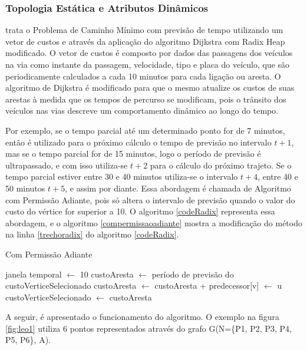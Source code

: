 \subsubsection{Topologia Estática e Atributos Dinâmicos}
\label{subsec:limitesuperior}
\cite{leonard} trata o Problema de Caminho Mínimo com previsão de tempo utilizando um vetor de custos e
através da aplicação do algoritmo Dijkstra com Radix Heap modificado. O vetor de custos é composto por dados das passagens 
dos veículos na via como instante da passagem, velocidade, tipo e placa do veículo, que são periodicamente calculados
a cada 10 minutos para cada ligação ou aresta. O algoritmo de Dijkstra é modificado para que o mesmo atualize os custos
de suas arestas à medida que os tempos de percurso se modificam, pois o trânsito dos veículos nas vias descreve um
comportamento dinâmico ao longo do tempo.

Por exemplo, se o tempo parcial até um determinado ponto for de 7 minutos, então
é utilizado para o próximo cálculo o tempo de previsão no intervalo $t + 1$, mas se o tempo parcial for de 15 minutos, logo
o período de previsão é ultrapassado, e com isso utiliza-se $t + 2$ para o cálculo do próximo trajeto. Se o tempo parcial
estiver entre 30 e 40 minutos utiliza-se o intervalo $t + 4$, entre 40 e 50 minutos $t + 5$, e assim por diante.
Essa abordagem é chamada de Algoritmo com Permissão Adiante, pois só altera o intervalo de previsão quando o valor do custo
do vértice for superior a 10.
O algoritmo \ref{codeRadix} representa essa abordagem, e o algoritmo \ref{compermissaoadiante} mostra a modificação
do método na linha \ref{trechoradix} do algoritmo \ref{codeRadix}.

\begin{algorithm}
\caption{Com Permissão Adiante}
\begin{algorithmic}[1]
\State janela temporal $\leftarrow$ 10
  \State custoAresta $\leftarrow$ período de previsão do custoVerticeSelecionado
\EndIf
{}
  \State custoAresta $\leftarrow$ custoAresta + 	
  \State predecessor[v] $\leftarrow$ u
\EndIf
\State custoVerticeSelecionado $\leftarrow$ custoAresta
\end{algorithmic}
\label{compermissaoadiante}
\end{algorithm}
\FloatBarrier

A seguir, é apresentado o funcionamento do algoritmo. O exemplo na figura \ref{fig:leo1} utiliza
6 pontos representados através do grafo G(N=\{P1, P2, P3, P4, P5, P6\}, A).

